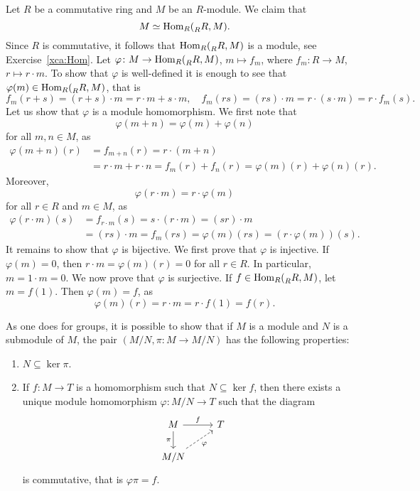 \begin{example}
Let $R$ be a commutative ring and $M$ be an $R$-module. We claim that 
\[
M\simeq\operatorname{Hom}_R(\prescript{}{R}R,M).
\]
Since $R$ is commutative, it follows that $\operatorname{Hom}_R(\prescript{}{R}R,M)$ is a module, see Exercise~\ref{xca:Hom}.
Let $\varphi\colon M\to\operatorname{Hom}_R(\prescript{}{R}R,M)$, $m\mapsto f_m$, where $f_m\colon R\to M$, $r\mapsto r\cdot m$. 
To show that $\varphi$ is well-defined it is enough to see that $\varphi(m)\in\operatorname{Hom}_R(\prescript{}{R}R,M)$, that is 
\[
f_m(r+s)=(r+s)\cdot m=r\cdot m+s\cdot m,\quad
f_m(rs)=(rs)\cdot m=r\cdot (s\cdot m)=r\cdot f_m(s).
\]
Let us show that $\varphi$ is a module homomorphism. We first note that 
\[
\varphi(m+n)=\varphi(m)+\varphi(n)
\]
for all $m,n\in M$, as  
\begin{align*}
\varphi(m+n)(r)&=f_{m+n}(r)=r\cdot (m+n)\\
&=r\cdot m+r\cdot n=f_m(r)+f_n(r)=\varphi(m)(r)+\varphi(n)(r).
\end{align*}
Moreover, 
\[
\varphi(r\cdot m)=r\cdot\varphi(m)
\]
for all  
$r\in R$ and $m\in M$, as  
\begin{align*}
\varphi(r\cdot m)(s)&=f_{r\cdot m}(s)
=s\cdot (r\cdot m)
=(sr)\cdot m\\
&=(rs)\cdot m=f_m(rs)=\varphi(m)(rs)=(r\cdot\varphi(m))(s).
\end{align*}
It remains to show that $\varphi$ is bijective. We first prove that
$\varphi$ is injective. If $\varphi(m)=0$, then $r\cdot m=\varphi(m)(r)=0$ for all $r\in R$. In particular, 
$m=1\cdot m=0$. We now prove that $\varphi$ is surjective. If $f\in\operatorname{Hom}_R(\prescript{}{R}R,M)$, 
let $m=f(1)$. Then $\varphi(m)=f$, as
\[
\varphi(m)(r)=r\cdot m=r\cdot f(1)=f(r).
\]
\end{example}

As one does for groups, it is possible to show that if $M$ is a 
module and $N$ is a submodule of $M$, the pair 
$(M/N,\pi\colon M\to M/N)$ has the following properties:
\begin{enumerate}
\item $N\subseteq \ker \pi$.
\item If $f\colon M\to T$ is a homomorphism such that $N\subseteq \ker f$, then there exists a 
unique module homomorphism $\varphi\colon M/N\to T$ such that 
the diagram
\[
\begin{tikzcd}
	M & T \\
	{M/N}
	\arrow["\pi"', from=1-1, to=2-1]
	\arrow["f", from=1-1, to=1-2]
	\arrow["{\varphi }"', dashed, from=2-1, to=1-2]
\end{tikzcd}
\]
is commutative, that is 
$\varphi\pi =f$.  
\end{enumerate}


